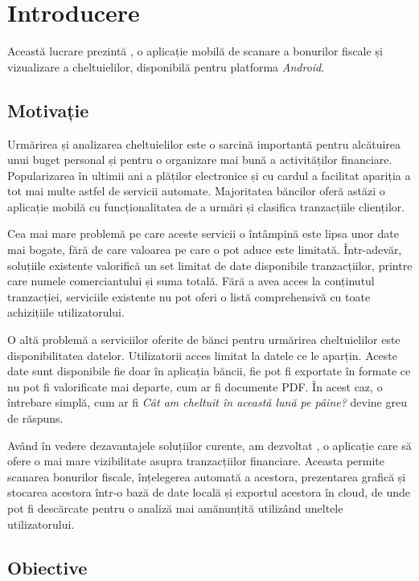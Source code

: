 \chapter{Introducere}\label{introducere}

Această lucrare prezintă \AppNameB, o aplicație mobilă de scanare a bonurilor fiscale și vizualizare a cheltuielilor, disponibilă pentru platforma \emph{Android}.

\section{Motivație}

Urmărirea și analizarea cheltuielilor este o sarcină importantă pentru alcătuirea unui buget personal și pentru o organizare mai bună a activităților financiare. Popularizarea în ultimii ani a plăților electronice și cu cardul a facilitat apariția a tot mai multe astfel de servicii automate. Majoritatea băncilor oferă astăzi o aplicație mobilă cu funcționalitatea de a urmări și clasifica tranzacțiile clienților.

Cea mai mare problemă pe care aceste servicii o întâmpină este lipsa unor date mai bogate, fără de care valoarea pe care o pot aduce este limitată. Într-adevăr, soluțiile existente valorifică un set limitat de date disponibile tranzacțiilor, printre care numele comerciantului și suma totală. Fără a avea acces la conținutul tranzacției, serviciile existente nu pot oferi o listă comprehensivă cu toate achizițiile utilizatorului.

O altă problemă a serviciilor oferite de bănci pentru urmărirea cheltuielilor este disponibilitatea datelor. Utilizatorii acces limitat la datele ce le aparțin. Aceste date sunt disponibile fie doar în aplicația băncii, fie pot fi exportate în formate ce nu pot fi valorificate mai departe, cum ar fi documente PDF. În acest caz, o întrebare simplă, cum ar fi \textit{Cât am cheltuit în această lună pe pâine?} devine greu de răspuns.

Având în vedere dezavantajele soluțiilor curente, am dezvoltat \AppName, o aplicație care să ofere o mai mare vizibilitate asupra tranzacțiilor financiare. Aceasta permite scanarea bonurilor fiscale, înțelegerea automată a acestora, prezentarea grafică și stocarea acestora într-o bază de date locală și exportul acestora în cloud, de unde pot fi descărcate pentru o analiză mai amănunțită utilizând uneltele utilizatorului.

\section{Obiective}

